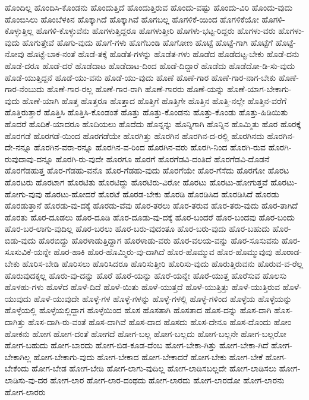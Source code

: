 {ಹೊಂದಿಲ್ಲ
ಹೊಂದಿಸಿ-ಕೊಂಡನು
ಹೊಂದುತ್ತಿದೆ
ಹೊಂದುತ್ತಿರುವ
ಹೊಂದು-ವಷ್ಟು
ಹೊಂದು-ವಿರಿ
ಹೊಂದು-ವುದು
ಹೊಂಬಿಸಿಲು
ಹೊಂಬೆಳಕಿನ
ಹೊಕ್ಕಾಗಿದೆ
ಹೊಕ್ಕಾಗಿವೆ
ಹೊಗಬಲ್ಲ
ಹೊಗಳಿಕೆ-ಯಿಂದ
ಹೊಗಳಿಕೆಯೋ
ಹೊಗಳಿ-ಕೊಳ್ಳುತ್ತಿಲ್ಲ
ಹೊಗಳಿ-ಕೊಳ್ಳುವೆನು
ಹೊಗಳುತ್ತಿದ್ದರೂ
ಹೊಗಳುತ್ತೀರಿ
ಹೊಗಳು-ಭಟ್ಟ-ರಿದ್ದರು
ಹೊಗಳು-ವರು
ಹೊಗಳು-ವುದು
ಹೊಗುತ್ತೇವೆ
ಹೊಗು-ವುದು
ಹೊಗೆ-ಗಳು
ಹೊಗೆಬಂಡಿ
ಹೊಗೋಣ
ಹೊಟ್ಟೆ
ಹೊಟ್ಟೆ-ಗಾಗಿ
ಹೊಟ್ಟೆಗೆ
ಹೊಟ್ಟೆ-ನೋವು
ಹೊಟ್ಟೆ-ಬಾಕ-ನಂತೆ
ಹೊಡೆ-ತಕ್ಕೆ
ಹೊಡೆತ-ಗಳನ್ನು
ಹೊಡೆತ-ಗಳು
ಹೊಡೆದ
ಹೊಡೆದಟ್ಟ-ಬೇಕು
ಹೊಡೆ-ದನು
ಹೊಡೆ-ದರೂ
ಹೊಡೆ-ದರೆ
ಹೊಡೆದಾಟ
ಹೊಡೆದಾಟ-ದಿಂದ
ಹೊಡೆ-ದಿದ್ದಾರೆ
ಹೊಡೆದು
ಹೊಡೆದೋ-ಡಿ-ಸು-ವುದು
ಹೊಡೆ-ಯುತ್ತಿದ್ದನೆ
ಹೊಡೆ-ಯು-ವನು
ಹೊಡೆ-ಯು-ವುದು
ಹೊಣೆ
ಹೊಣೆ-ಗಾರ
ಹೊಣೆ-ಗಾರ-ನಾಗ-ಬೇಕು
ಹೊಣೆ-ಗಾರ-ನೆಂಬುದು
ಹೊಣೆ-ಗಾರ-ರಲ್ಲ
ಹೊಣೆ-ಗಾರ-ರಾಗಿ
ಹೊಣೆ-ಗಾರರು
ಹೊಣೆ-ಯನ್ನು
ಹೊಣೆ-ಯಾಗ-ಬೇಕಾಗು-ವುದು
ಹೊಣೆ-ಯಾಗಿ
ಹೊತ್ತ
ಹೊತ್ತರೂ
ಹೊತ್ತಾದ
ಹೊತ್ತಿಗೆ
ಹೊತ್ತಿಗೇ
ಹೊತ್ತಿನ
ಹೊತ್ತಿ-ನಲ್ಲೇ
ಹೊತ್ತಿನ-ವರೆಗೆ
ಹೊತ್ತಿರುತ್ತಾರೆ
ಹೊತ್ತಿಸಿ
ಹೊತ್ತಿಸಿ-ಕೊಂಡಂತೆ
ಹೊತ್ತು
ಹೊತ್ತು-ಕೊಂಡನು
ಹೊತ್ತು-ಕೊಂಡು
ಹೊತ್ತು-ಹಿಡಿಯಿತು
ಹೊದರೆ
ಹೊದಿಕೆ-ಯಾದರೂ
ಹೊದಿಯಲು
ಹೊದೆದು
ಹೊನ್ನನ್ನು
ಹೊನ್ನಿಗಾಗಿ
ಹೊನ್ನಿನ
ಹೊಮ್ಮಿತು
ಹೊರ
ಹೊರಕ್ಕೆ
ಹೊರಗಡೆ
ಹೊರಗಡೆ-ಯಿಂದ
ಹೊರಗಡೆಯೇ
ಹೊರಗಿತ್ತು
ಹೊರಗಿನ
ಹೊರಗಿನ-ದ-ರಲ್ಲಿ
ಹೊರಗಿನದು
ಹೊರಗಿನ-ದೇ-ನನ್ನೂ
ಹೊರಗಿನ-ವರಾ-ರನ್ನೂ
ಹೊರಗಿನ-ವ-ರಿಂದ
ಹೊರಗಿನ-ವರು
ಹೊರಗಿ-ನಿಂದ
ಹೊರಗಿ-ರುವ
ಹೊರಗಿ-ರುವುದಾವು-ದನ್ನೂ
ಹೊರಗಿ-ರು-ವುದೇ
ಹೊರಗೂ
ಹೊರಗೆ
ಹೊರಗೆಡವಿ-ದಂತಿದೆ
ಹೊರಗೆಡವಿ-ದೊಡನೆ
ಹೊರಗೆಡಹುತ್ತ
ಹೊರ-ಗೆಡಹು-ವನೊ
ಹೊರ-ಗೆಡಹು-ವುದು
ಹೊರಗೆಯೇ
ಹೊರ-ಗೆಸೆದು
ಹೊರಗೋ
ಹೊರಟ
ಹೊರಟರು
ಹೊರಟಾಗ
ಹೊರಟಿತು
ಹೊರಟಿದ್ದು
ಹೊರಟಿರು-ವಿರೋ
ಹೊರಟು
ಹೊರಟು-ಹೋಗುತ್ತವೆ
ಹೊರಟು-ಹೋಗು-ವುವು
ಹೊರಟು-ಹೋದರೆ
ಹೊರಟೆ
ಹೊರಡ-ಬೇಕು
ಹೊರಡಿ
ಹೊರಡಿಸಿದ
ಹೊರಡಿಸಿದೆ
ಹೊರಡು
ಹೊರಡುತ್ತಾನೆ
ಹೊರಡು-ವು-ದಕ್ಕೆ
ಹೊರಡು-ವೆವು
ಹೊರ-ತರಲು
ಹೊರ-ತರುವ
ಹೊರ-ತರು-ವುದು
ಹೊರ-ತಾಗಿದೆ
ಹೊರತು
ಹೊರ-ದೂಡಲು
ಹೊರ-ದೂಡಿ
ಹೊರ-ದೂಡು-ವು-ದಕ್ಕೆ
ಹೊರ-ಬಂದರೆ
ಹೊರ-ಬಂದವು
ಹೊರ-ಬಂದು
ಹೊರ-ಬರ-ಲಾಗು-ವುದಿಲ್ಲ
ಹೊರ-ಬರಲು
ಹೊರ-ಬರು-ವುದಂತೂ
ಹೊರ-ಬರು-ವುದು
ಹೊರ-ಬಹುದು
ಹೊರ-ಬಿಡು-ವುದು
ಹೊರಬಿದ್ದು
ಹೊರಳಾಡುತ್ತಿದ್ದಾಗ
ಹೊರಳಾಡು-ವರು
ಹೊರ-ವಲಯ-ವನ್ನು
ಹೊರ-ಸೂಸುವನು
ಹೊರ-ಸೂಸುವಿಕೆ-ಯನ್ನೇ
ಹೊರ-ಹಾಕಿ
ಹೊರ-ಹೊಮ್ಮಿರು-ವು-ದಾಗಿದೆ
ಹೊರ-ಹೊಮ್ಮುವ
ಹೊರ-ಹೊಮ್ಮುವುವು
ಹೊರಾಡ-ಬೇಕು
ಹೊರಿಸ-ಬೇಡಿ
ಹೊರಿಸಲು
ಹೊರಿಸಿದರೂ
ಹೊರಿಸುತ್ತೀರಿ
ಹೊರಿಸು-ವುದು
ಹೊರುತ್ತಿರುವನು
ಹೊರುವ-ವ-ರೆಲ್ಲ
ಹೊರುವುದಕ್ಕಲ್ಲ
ಹೊರು-ವು-ದನ್ನು
ಹೊರೆ
ಹೊರೆ-ಯನ್ನು
ಹೊರೆ-ಯನ್ನೇ
ಹೊರೆ-ಯುತ್ತ
ಹೊರೆಸುವ
ಹೊಲಸು
ಹೊಳಹು-ಗಳು
ಹೊಳೆದ
ಹೊಳೆ-ದಿದೆ
ಹೊಳೆ-ಯಿತು
ಹೊಳೆ-ಯುತ್ತದೆ
ಹೊಳೆ-ಯುತ್ತಿತ್ತು
ಹೊಳೆ-ಯುತ್ತಿರುವ
ಹೊಳೆ-ಯುವುದು
ಹೊಳೆ-ಯುವುದೇ
ಹೊಳ್ಳೆ-ಗಳ
ಹೊಳ್ಳೆ-ಗಳನ್ನು
ಹೊಳ್ಳೆ-ಗಳಲ್ಲಿ
ಹೊಳ್ಳೆ-ಗಳಿಂದ
ಹೊಳ್ಳೆಯ
ಹೊಳ್ಳೆಯನ್ನು
ಹೊಳ್ಳೆಯಲ್ಲಿ
ಹೊಳ್ಳೆಯಲ್ಲಿದ್ದಾಗ
ಹೊಳ್ಳೆಯಿಂದ
ಹೊಸ
ಹೊಸತಾಗಿ
ಹೊಸತಾದ
ಹೊಸ-ದನ್ನು
ಹೊಸ-ದಾಗಿ
ಹೊಸ-ದಾಗಿತ್ತು
ಹೊಸ-ದಾಗಿ-ರು-ವಂತೆ
ಹೊಸ-ದಾಗಿವೆ
ಹೊಸ-ದಾದ
ಹೊಸದು
ಹೊಸ-ದೇನೂ
ಹೊಸ-ದೊಂದು
ಹೋಂ
ಹೋಕನು
ಹೋಗ
ಹೋಗ-ದಂತೆ
ಹೋಗದೆ
ಹೋಗ-ಬಲ್ಲ
ಹೋಗ-ಬಲ್ಲದು
ಹೋಗ-ಬಲ್ಲನೇ
ಹೋಗ-ಬಲ್ಲರೋ
ಹೋಗ-ಬಹುದು
ಹೋಗ-ಬಾರದು
ಹೋಗ-ಬಿಡ-ಕೂಡ-ದೆಂಬ
ಹೋಗ-ಬೇಕಾ-ಗಿತ್ತು
ಹೋಗ-ಬೇಕಾ-ಗಿದೆ
ಹೋಗ-ಬೇಕಾಗಿಲ್ಲ
ಹೋಗ-ಬೇಕಾಗು-ವುದು
ಹೋಗ-ಬೇಕಾದ
ಹೋಗ-ಬೇಕಾದರೆ
ಹೋಗ-ಬೇಕು
ಹೋಗ-ಬೇಕೆ
ಹೋಗ-ಬೇಕೆಂದು
ಹೋಗ-ಬೇಡ
ಹೋಗ-ಬೇಡಿ
ಹೋಗ-ಲಾಗು-ವುದಿಲ್ಲ
ಹೋಗ-ಲಾಡಿಸಬಲ್ಲದೇ
ಹೋಗ-ಲಾಡಿಸಲು
ಹೋಗ-ಲಾಡಿಸು-ವು-ದರ
ಹೋಗ-ಲಾರ
ಹೋಗ-ಲಾರ-ದಂಥದು
ಹೋಗ-ಲಾರದು
ಹೋಗ-ಲಾರದೋ
ಹೋಗ-ಲಾರನು
ಹೋಗ-ಲಾರರು
}
